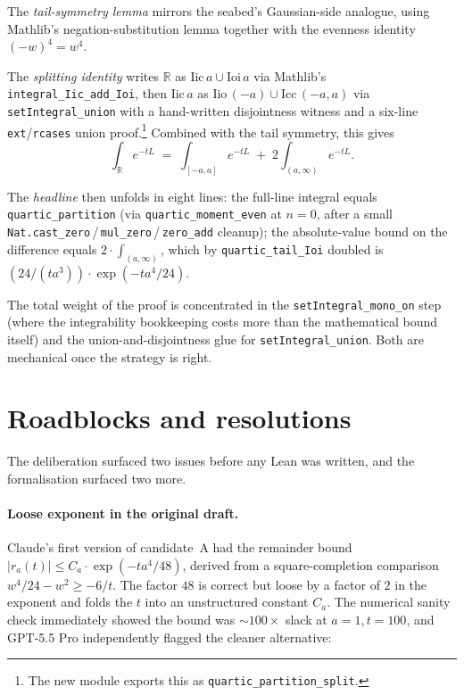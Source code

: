 \documentclass[11pt]{article}
\begin{document}
The \emph{tail-symmetry lemma} mirrors the seabed's Gaussian-side
analogue, using Mathlib's negation-substitution lemma together with the
evenness identity $(-w)^4 = w^4$.

The \emph{splitting identity} writes $\mathbb{R}$ as
$\text{Iic}\,a \cup \text{Ioi}\,a$ via Mathlib's
\texttt{integral\_Iic\_add\_Ioi}, then $\text{Iic}\,a$ as
$\text{Iio}\,(-a) \cup \text{Icc}\,(-a,a)$ via
\texttt{setIntegral\_union} with a hand-written disjointness witness
and a six-line \texttt{ext}/\texttt{rcases} union proof.\footnote{The
new module exports this as \texttt{quartic\_partition\_split}.}
Combined with the tail symmetry, this gives
\[
  \int_\mathbb{R} e^{-t L} \;=\; \int_{[-a,a]} e^{-t L}
                                \;+\; 2\int_{(a,\infty)} e^{-t L}.
\]

The \emph{headline} then unfolds in eight lines: the full-line integral
equals \texttt{quartic\_partition} (via
\texttt{quartic\_moment\_even} at $n = 0$, after a small
\texttt{Nat.cast\_zero}\,/\,\texttt{mul\_zero}\,/\,\texttt{zero\_add} cleanup);
the absolute-value bound on the difference equals $2 \cdot
\int_{(a,\infty)}$, which by \texttt{quartic\_tail\_Ioi} doubled is
$(24/(t a^3)) \cdot \exp(-t a^4/24)$.

The total weight of the proof is concentrated in the
\texttt{setIntegral\_mono\_on} step (where the integrability bookkeeping
costs more than the mathematical bound itself) and the union-and-disjointness
glue for \texttt{setIntegral\_union}. Both are mechanical once the
strategy is right.

\section{Roadblocks and resolutions}

The deliberation surfaced two issues before any Lean was written, and
the formalisation surfaced two more.

\paragraph{Loose exponent in the original draft.}
Claude's first version of candidate~A had the remainder bound
$|r_a(t)| \le C_a \cdot \exp(-t a^4/48)$, derived from a
square-completion comparison $w^4/24 - w^2 \ge -6/t$. The factor $48$ is
correct but loose by a factor of $2$ in the exponent and folds the $t$
into an unstructured constant $C_a$. The numerical sanity check
immediately showed the bound was $\sim 100\times$ slack at $a=1, t=100$,
and GPT-5.5 Pro independently flagged the cleaner alternative:
\end{document}
